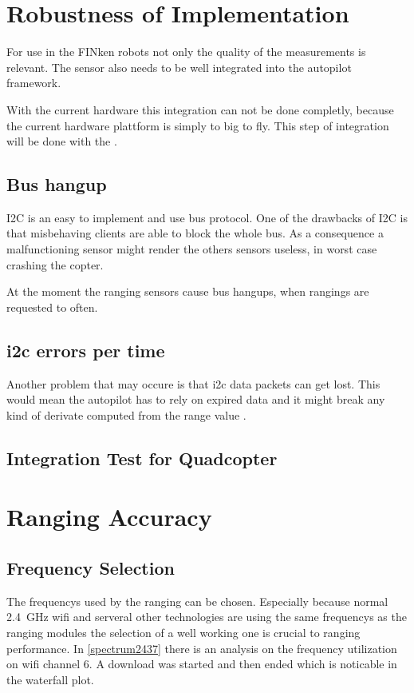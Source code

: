 
\section{Robustness of Implementation}

For use in the FINken robots not only the quality of the measurements is relevant.
The sensor also needs to be well integrated into the autopilot framework.

With the current hardware this integration can not be done completly, because the current hardware plattform is simply to big to fly.
This step of integration will be done with the .

\subsection{Bus hangup}
I2C is an easy to implement and use bus protocol.
One of the drawbacks of I2C is that misbehaving clients are able to block the whole bus.
As a consequence a malfunctioning sensor might render the others sensors useless, in worst case crashing the copter.

At the moment the ranging sensors cause bus hangups, when rangings are requested to often.

\subsection{i2c errors per time}
Another problem that may occure is that i2c data packets can get lost.
This would mean the autopilot has to rely on expired data and it might break any kind of derivate computed from the range value .

\subsection{Integration Test for Quadcopter}


\section{Ranging Accuracy}

\subsection{Frequency Selection}
The frequencys used by the ranging can be chosen.
Especially because normal \SI{2.4}{\giga\hertz} wifi and serveral other technologies are using the same frequencys as the ranging modules the selection of a well working one is crucial to ranging performance.
In \autoref{spectrum2437} there is an analysis on the frequency utilization on wifi channel 6.
A download was started and then ended which is noticable in the waterfall plot.

